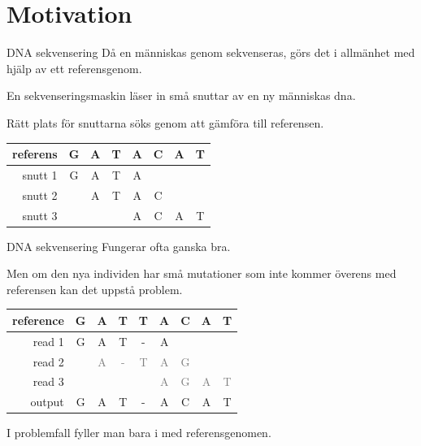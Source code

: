 \documentclass[11pt, aspectratio=169, table]{beamer}
\begin{document}
\section{Motivation}
\begin{frame}{DNA sekvensering}
\setlength{\parskip}{\fill}
Då en människas genom sekvenseras, görs det i allmänhet med hjälp av ett referensgenom.

En sekvenseringsmaskin läser in små snuttar av en ny människas dna.

Rätt plats för snuttarna söks genom att gämföra till referensen.

\begin{center}
\tt \begin{tabular}{r|ccccccc}
\sf referens & G & A & T & A & C & A & T\\
\hline
\sf snutt 1 & G & A & T & A\\
\sf snutt 2 &   & A & T & A & C\\
\sf snutt 3 &   &   &   & A & C & A & T
\end{tabular}
\end{center}
\end{frame}

\begin{frame}{DNA sekvensering}
\setlength{\parskip}{\fill}
Fungerar ofta ganska bra.

Men om den nya individen har små mutationer som inte kommer överens med referensen kan det uppstå problem.

\begin{center}
\tt \begin{tabular}{r|cccccccc}
\sf reference & G & A & T & T & A & C & A & T\\
\hline
\sf read 1    & G & A & T & - & A\\
\sf read 2    &   & \textcolor{gray}{A} & \textcolor{gray}{-} & \textcolor{gray}{T} & \textcolor{gray}{A} & \textcolor{gray}{G}\\
\sf read 3    &   &   &   &   & \textcolor{gray}{A} & \textcolor{gray}{G} & \textcolor{gray}{A} & \textcolor{gray}{T}\\
\hline
\sf output    & G & A & T & - & A & C & A & T
\end{tabular}
\end{center}

I problemfall fyller man bara i med referensgenomen.
\end{frame}
\end{document}
